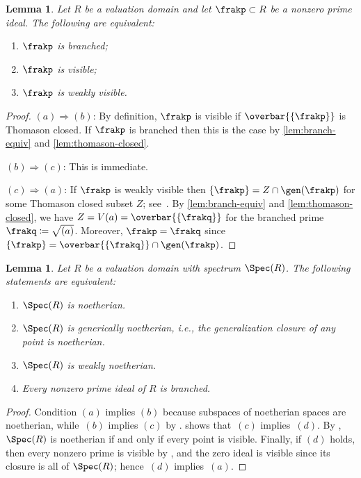 \documentclass{amsart}
\numberwithin{equation}{section}%
\newtheorem{Lem}[equation]{Lemma}
\theoremstyle{remark}
\newcounter{enum-resume-hack}
\begin{document}
\begin{Lem}\label{lem:branched-visible}
	Let $R$ be a valuation domain and let $\frakp \subset R$ be a nonzero prime ideal. The following are equivalent:
	\begin{enumerate}
		\item $\frakp$ is branched;
		\item $\frakp$ is visible;
		\item $\frakp$ is weakly visible.
	\end{enumerate}
\end{Lem}

\begin{proof}
	$(a) \Rightarrow (b)$: By definition, $\frakp$ is visible if $\overbar{\{\frakp\}}$ is Thomason closed. If $\frakp$ is branched then this is the case by \cref{lem:branch-equiv} and \cref{lem:thomason-closed}.

	$(b) \Rightarrow (c)$: This is immediate.

	$(c) \Rightarrow (a)$: If $\frakp$ is weakly visible then $\{\frakp\} = Z \cap \gen(\frakp)$ for some Thomason closed subset $Z$; see~\cite[Remark~2.8]{BarthelHeardSanders23a}. By \cref{lem:branch-equiv} and \cref{lem:thomason-closed}, we have $Z=V(a) = \overbar{\{\frakq\}}$ for the branched prime $\frakq \coloneqq \sqrt{(a)}$. Moreover, $\frakp = \frakq$ since $\{\frakp\} = \overbar{\{\frakq\}} \cap \gen(\frakp)$.
\end{proof}

\begin{Lem}\label{lem:noetherian}
	Let $R$ be a valuation domain with spectrum $\Spec(R)$. The following statements are equivalent:
	\begin{enumerate}
		\item $\Spec(R)$ is noetherian.
		\item $\Spec(R)$ is generically noetherian, i.e., the generalization closure of any point is noetherian. 
		\item $\Spec(R)$ is weakly noetherian.
		\item Every nonzero prime ideal of $R$ is branched.
	\end{enumerate}
\end{Lem}

\begin{proof}
	Condition $(a)$ implies $(b)$ because subspaces of noetherian spaces are noetherian, while~$(b)$ implies $(c)$ by \cite[Lemma 9.9]{BarthelHeardSanders23a}.  shows that~$(c)$ implies~$(d)$. By \cite[Proposition~7.13]{BalmerFavi11}, $\Spec(R)$ is noetherian if and only if every point is visible. Finally, if $(d)$ holds, then every nonzero prime is visible by , and the zero ideal is visible since its closure is all of $\Spec(R)$; hence~$(d)$ implies~$(a)$.
\end{proof}
\end{document}
